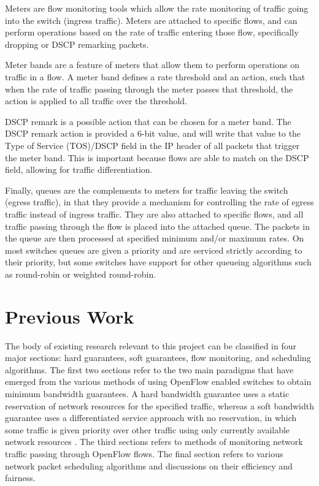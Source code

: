 \documentclass[accepted,single]{gipaper}
\begin{document}
Meters are flow monitoring tools which allow the rate monitoring of traffic going into the switch (ingress traffic). Meters are attached to specific flows, and can perform operations based on the rate of traffic entering those flow, specifically dropping or DSCP remarking packets.

Meter bands are a feature of meters that allow them to perform operations on traffic in a flow. A meter band defines a rate threshold and an action, such that when the rate of traffic passing through the meter passes that threshold, the action is applied to all traffic over the threshold.

DSCP remark is a possible action that can be chosen for a meter band. The DSCP remark action is provided a 6-bit value, and will write that value to the Type of Service (TOS)/DSCP field in the IP header of all packets that trigger the meter band. This is important because flows are able to match on the DSCP field, allowing for traffic differentiation.

Finally, queues are the complements to meters for traffic leaving the switch (egress traffic), in that they provide a mechanism for controlling the rate of egress traffic instead of ingress traffic. They are also attached to specific flows, and all traffic passing through the flow is placed into the attached queue. The packets in the queue are then processed at specified minimum and/or maximum rates. On most switches queues are given a priority and are serviced strictly according to their priority, but some switches have support for other queueing algorithms such as round-robin or weighted round-robin.

\section{Previous Work}
\label{prev_work}

The body of existing research relevant to this project can be classified in four major sections: hard guarantees, soft guarantees, flow monitoring, and scheduling algorithms. The first two sections refer to the two main paradigms that have emerged from the various methods of using OpenFlow enabled switches to obtain minimum bandwidth guarantees. A hard bandwidth guarantee uses a static reservation of network resources for the specified traffic, whereas a soft bandwidth guarantee uses a differentiated service approach with no reservation, in which some traffic is given priority over other traffic using only currently available network resources \cite{softqos}. The third sections refers to methods of monitoring network traffic passing through OpenFlow flows. The final section refers to various network packet scheduling algorithms and discussions on their efficiency and fairness.
\end{document}
